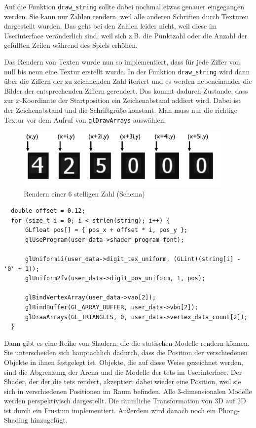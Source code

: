 \documentclass[11pt]{article}
\newcommand{\lstin}[1]{\lstinline[language=C]{#1}}
\begin{document}
Auf die Funktion \lstin{draw_string} sollte dabei nochmal etwas genauer eingegangen werden.
Sie kann nur Zahlen rendern, weil alle anderen Schriften durch Texturen dargestellt wurden.
Das geht bei den Zahlen leider nicht, weil diese im Userinterface veränderlich sind, 
weil sich z.B. die Punktzahl oder die Anzahl der gefüllten Zeilen während des Spiels erhöhen.

Das Rendern von Texten wurde nun so implementiert, dass für jede Ziffer von null bis neun eine Textur erstellt wurde.
In der Funktion \lstin{draw_string} wird dann über die Ziffern der zu zeichnenden Zahl iteriert 
und es werden nebeneinander die Bilder der entsprechenden Ziffern gerendert. 
Das kommt dadurch Zustande, dass zur $x$-Koordinate der Startposition ein Zeichenabstand addiert wird.  
Dabei ist der Zeichenabstand und die Schriftgröße konstant.
Man muss nur die richtige Textur vor dem Aufruf von \lstin{glDrawArrays} auswählen.

\begin{figure}[h]
  \centering
  \includegraphics[width=400px]{../images/font.jpg}
  \caption{Rendern einer 6 stelligen Zahl (Schema)}
\end{figure}

\begin{lstlisting}
  double offset = 0.12;
  for (size_t i = 0; i < strlen(string); i++) {
      GLfloat pos[] = { pos_x + offset * i, pos_y };
      glUseProgram(user_data->shader_program_font);

      glUniform1i(user_data->digit_tex_uniform, (GLint)(string[i] - '0' + 1));
      glUniform2fv(user_data->digit_pos_uniform, 1, pos);

      glBindVertexArray(user_data->vao[2]);
      glBindBuffer(GL_ARRAY_BUFFER, user_data->vbo[2]);
      glDrawArrays(GL_TRIANGLES, 0, user_data->vertex_data_count[2]);
  }
\end{lstlisting}

Dann gibt es eine Reihe von Shadern, die die statischen Modelle rendern können.
Sie unterscheiden sich hauptächlich dadurch, 
dass die Position der verschiedenen Objekte in ihnen festgelegt ist. 
Objekte, die auf diese Weise gezeichnet werden, sind die Abgrenzung der Arena und die Modelle der \glspl{tet} im Userinterface.
Der Shader, der der die \glspl{tet} rendert, akzeptiert dabei wieder eine Position, weil sie sich in verschiedenen Positionen im Raum befinden.
Alle 3-dimensionalen Modelle werden perspektivisch dargestellt. Die räumliche Transformation von 3D auf 2D ist durch ein Frustum implementiert.
Außerdem wird danach noch ein Phong-Shading hinzugefügt.
\end{document}

